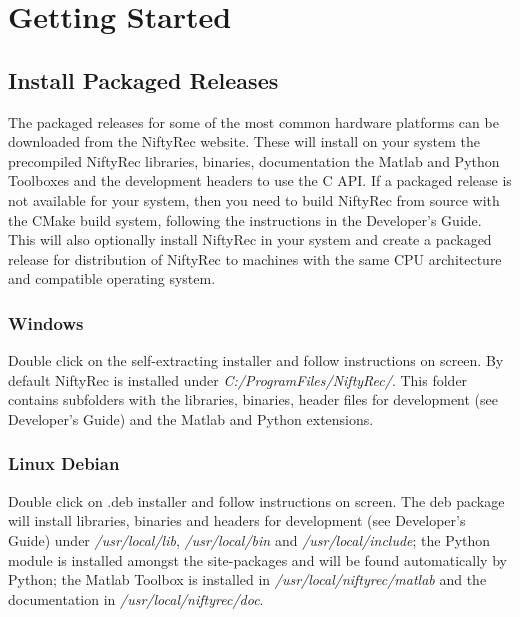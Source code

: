 \documentclass[12pt,a4paper]{report}
\begin{document}
\section{Getting Started}

\subsection{Install Packaged Releases}
\label{sec:packaged_release}
The packaged releases for some of the most common hardware platforms can be downloaded from 
the NiftyRec website. These will install on your system the precompiled NiftyRec libraries, 
binaries, documentation the Matlab and Python Toolboxes and the development headers to use the C API. 
If a packaged release is not available for your system, then you need to build NiftyRec from source with the CMake build system, following 
the instructions in the Developer's Guide. This will also optionally install NiftyRec in your system and create a packaged release 
for distribution of NiftyRec to machines with the same CPU architecture and compatible operating system. 

\subsubsection{Windows}

Double click on the self-extracting installer and follow instructions on screen. 
By default NiftyRec is installed under \emph{C:/ProgramFiles/NiftyRec/}. This folder contains 
subfolders with the libraries, binaries, header files for development (see Developer's Guide) 
and the Matlab and Python extensions. 

\subsubsection{Linux Debian}
Double click on .deb installer and follow instructions on screen. The deb package will install 
libraries, binaries and headers for development (see Developer's Guide) under \emph{/usr/local/lib}, \emph{/usr/local/bin} 
and \emph{/usr/local/include}; the Python module is installed amongst the site-packages and will 
be found automatically by Python; the Matlab Toolbox is installed in \emph{/usr/local/niftyrec/matlab} and the documentation in 
\emph{/usr/local/niftyrec/doc}.

\end{document}
